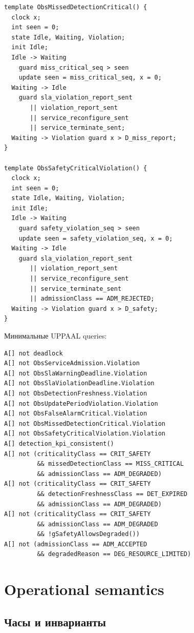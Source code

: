 \documentclass[10pt,a4paper]{article}
\begin{document}
\begin{verbatim}
template ObsMissedDetectionCritical() {
  clock x;
  int seen = 0;
  state Idle, Waiting, Violation;
  init Idle;
  Idle -> Waiting
    guard miss_critical_seq > seen
    update seen = miss_critical_seq, x = 0;
  Waiting -> Idle
    guard sla_violation_report_sent
       || violation_report_sent
       || service_reconfigure_sent
       || service_terminate_sent;
  Waiting -> Violation guard x > D_miss_report;
}

template ObsSafetyCriticalViolation() {
  clock x;
  int seen = 0;
  state Idle, Waiting, Violation;
  init Idle;
  Idle -> Waiting
    guard safety_violation_seq > seen
    update seen = safety_violation_seq, x = 0;
  Waiting -> Idle
    guard sla_violation_report_sent
       || violation_report_sent
       || service_reconfigure_sent
       || service_terminate_sent
       || admissionClass == ADM_REJECTED;
  Waiting -> Violation guard x > D_safety;
}
\end{verbatim}

Минимальные UPPAAL queries:
\begin{verbatim}
A[] not deadlock
A[] not ObsServiceAdmission.Violation
A[] not ObsSlaWarningDeadline.Violation
A[] not ObsSlaViolationDeadline.Violation
A[] not ObsDetectionFreshness.Violation
A[] not ObsUpdatePeriodViolation.Violation
A[] not ObsFalseAlarmCritical.Violation
A[] not ObsMissedDetectionCritical.Violation
A[] not ObsSafetyCriticalViolation.Violation
A[] detection_kpi_consistent()
A[] not (criticalityClass == CRIT_SAFETY
         && missedDetectionClass == MISS_CRITICAL
         && admissionClass == ADM_DEGRADED)
A[] not (criticalityClass == CRIT_SAFETY
         && detectionFreshnessClass == DET_EXPIRED
         && admissionClass == ADM_DEGRADED)
A[] not (criticalityClass == CRIT_SAFETY
         && admissionClass == ADM_DEGRADED
         && !gSafetyAllowsDegraded())
A[] not (admissionClass == ADM_ACCEPTED
         && degradedReason == DEG_RESOURCE_LIMITED)
\end{verbatim}

\section{Operational semantics}

\subsection{Часы и инварианты}
\end{document}
